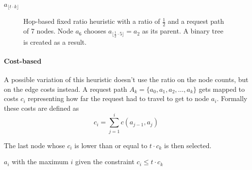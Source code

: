 \documentclass[a4paper, oneside]{discothesis}
\begin{document}
\begin{algorithmic}
\State\Return $a_{\lfloor t\cdot k\rfloor}$
\EndFunction
\end{algorithmic}

\begin{figure}[H]
\centering
{}
\caption{Hop-based fixed ratio heuristic with a ratio of $\frac{1}{2}$ and a request path of 7 nodes. Node $a_{6}$ chooses $a_{\lfloor \frac{1}{2}\cdot 5 \rfloor}=a_{2}$ as its parent. A binary tree is created as a result.}
\label{fig:fpr}
\end{figure}

\paragraph{Cost-based}\label{alg:frc}

A possible variation of this heuristic doesn't use the ratio on the node counts, but on the edge costs instead. A request path $A_k=\{a_{0},a_{1},a_{2},\dots,a_{k}\}$ gets mapped to costs $c_i$ representing how far the request had to travel to get to node $a_i$. Formally these costs are defined as
\begin{equation}
c_i=\sum_{j=1}^ic(a_{j-1},a_{j})
\end{equation}

The last node whose $c_i$ is lower than or equal to $t\cdot c_k$ is then selected.

\begin{algorithmic}
\State\Return $a_{i}$ with the maximum $i$ given the constraint $c_i\leq t\cdot c_k$ 
\EndFunction
\end{algorithmic}
\end{document}
